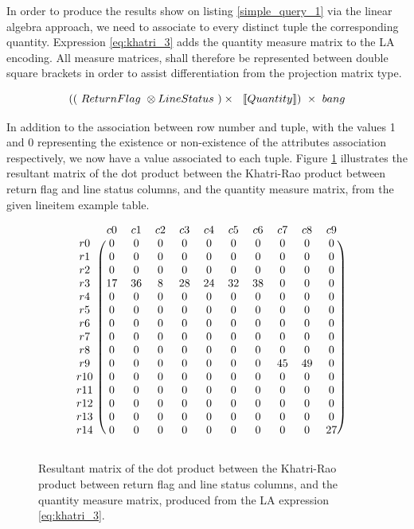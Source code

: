 In order to produce the results show on listing \ref{simple_query_1} via the linear algebra approach, we need to associate to every distinct tuple the corresponding quantity. Expression \ref{eq:khatri_3} adds the quantity measure matrix to the LA encoding. All measure matrices, shall therefore be represented between double square brackets in order to assist differentiation from the projection matrix type.
 
\begin{equation}
\centering
( (\ ReturnFlag\ \otimes LineStatus\ ) \times\ \ \llbracket Quantity \rrbracket )\ \times\ bang
\label{eq:khatri_3}
\end{equation}

In addition to the  association between row number and tuple, with the values 1 and 0 representing the existence or non-existence of the attributes association respectively, we now have a value associated to each tuple. 
Figure \ref{fig:final_matrix_krao_qtt_bang} illustrates the resultant matrix of the dot product between the Khatri-Rao product between return flag and line status columns, and the quantity measure matrix, from the given lineitem example table.


\begin{figure}[H]
\centering
\caption{Resultant matrix of the dot product between the Khatri-Rao product between return flag and line status columns, and the quantity measure matrix, produced from the LA expression \ref{eq:khatri_3}.}
\[
\begin{blockarray}{ccccccccccc}
		& c	0	& c	1	& c	2	& c	3	& c	4	& c	5	& c	6	& c	7	& c	8	& c	9	\\
\begin{block}{c(cccccccccc)}
r	0	&	0	&	0	&	0	&	0	&	0	&	0	&	0	&	0	&	0	&	0	\\
r	1	&	0	&	0	&	0	&	0	&	0	&	0	&	0	&	0	&	0	&	0	\\
r	2	&	0	&	0	&	0	&	0	&	0	&	0	&	0	&	0	&	0	&	0	\\
r	3	&	17	&	36	&	8	&	28	&	24	&	32	&	38	&	0	&	0	&	0	\\
r	4	&	0	&	0	&	0	&	0	&	0	&	0	&	0	&	0	&	0	&	0	\\
r	5	&	0	&	0	&	0	&	0	&	0	&	0	&	0	&	0	&	0	&	0	\\
r	6	&	0	&	0	&	0	&	0	&	0	&	0	&	0	&	0	&	0	&	0	\\
r	7	&	0	&	0	&	0	&	0	&	0	&	0	&	0	&	0	&	0	&	0	\\
r	8	&	0	&	0	&	0	&	0	&	0	&	0	&	0	&	0	&	0	&	0	\\
r	9	&	0	&	0	&	0	&	0	&	0	&	0	&	0	&	45	&	49	&	0	\\
r	10	&	0	&	0	&	0	&	0	&	0	&	0	&	0	&	0	&	0	&	0	\\
r	11	&	0	&	0	&	0	&	0	&	0	&	0	&	0	&	0	&	0	&	0	\\
r	12	&	0	&	0	&	0	&	0	&	0	&	0	&	0	&	0	&	0	&	0	\\
r	13	&	0	&	0	&	0	&	0	&	0	&	0	&	0	&	0	&	0	&	0	\\
r	14	&	0	&	0	&	0	&	0	&	0	&	0	&	0	&	0	&	0	&	27	\\
\end{block}
\end{blockarray}
\]
\label{fig:final_matrix_krao_qtt_bang}
\end{figure}

